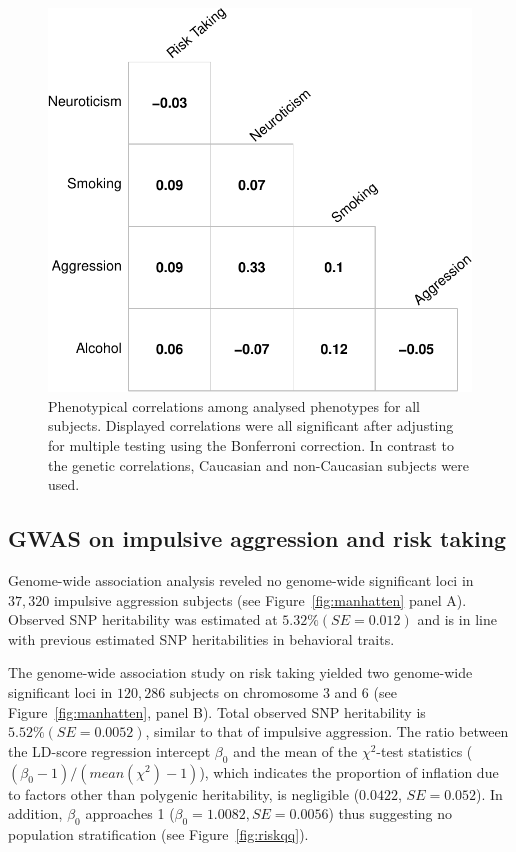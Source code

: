 \begin{figure}[htpb]
  \centering
  \includegraphics[width=0.6\linewidth]{ukb_assoc/figure/phenotype/corr_plot_ci.pdf} 
  \caption[Phenotypical correlations]{
    Phenotypical correlations among analysed phenotypes for all subjects.
    Displayed correlations were all significant after adjusting for multiple testing using the Bonferroni correction.
    In contrast to the genetic correlations, Caucasian and non-Caucasian subjects were used.
  }\label{fig:corr_pheno}
\end{figure}

\subsection{GWAS on impulsive aggression and risk taking}
\label{sub:gwas}

Genome-wide association analysis reveled no genome-wide significant loci in $37,320$ impulsive aggression subjects (see Figure~\ref{fig:manhatten} panel A).
Observed SNP heritability was estimated at $5.32\% (SE=0.012)$ and is in line with previous estimated SNP heritabilities in behavioral traits.

The genome-wide association study on risk taking yielded two genome-wide significant loci in $120,286$ subjects on chromosome 3 and 6 (see Figure~\ref{fig:manhatten}, panel B).
Total observed SNP heritability is  $5.52\% (SE=0.0052)$, similar to that of impulsive aggression.
The ratio between the LD-score regression intercept $\beta_0$ and the mean of the $\chi^2$-test statistics ($(\beta_0 - 1)/(mean(\chi^2)-1)$),
which indicates the proportion of inflation due to factors other than polygenic heritability, is  negligible ($0.0422$, $SE=0.052$).
In addition, $\beta_0$ approaches 1 ($\beta_0=1.0082, SE=0.0056$) thus suggesting no population stratification (see Figure~\ref{fig:riskqq}).

